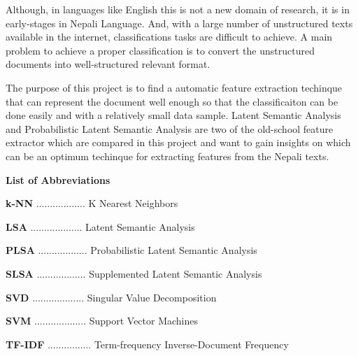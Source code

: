 \documentclass[12pt]{report}
\begin{document}
        Although, in languages like English this is not a new domain of research, it is in early-stages in Nepali Language. And, with a large 
        number of unstructured texts available in the internet, classifications tasks are difficult to achieve. A main problem to achieve a proper 
        classification is to convert the unstructured documents into well-structured relevant format. 

        The purpose of this project is to find a automatic feature extraction techinque that can represent the document well enough so that the classificaiton can be
        done easily and with a relatively small data sample. Latent Semantic Analysis and Probabilistic Latent Semantic Analysis are two of the old-school 
        feature extractor which are compared in this project and want to gain insights on which can be an optimum techinque for extracting features from the Nepali texts.
        
        


    \newpage


    \begin{center}
        \textbf{
            List of Abbreviations
        }

       



    \end{center}



    \textbf{k-NN} .................. K Nearest Neighbors


    \textbf{LSA} ................... Latent Semantic Analysis



    \textbf{PLSA} .................. Probabilistic Latent Semantic Analysis





    \textbf{SLSA} .................. Supplemented Latent Semantic Analysis



    \textbf{SVD} ................... Singular Value Decomposition



    \textbf{SVM} ................... Support Vector Machines




    \textbf{TF-IDF} ................ Term-frequency Inverse-Document Frequency
    
    \newpage

    \listoffigures
    
\end{document}
